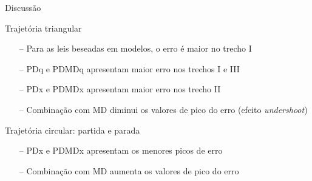 \documentclass[25pt,landscape]{beamer}
\begin{document}
\begin{frame}{Discussão}
        \begin{block}{Trajetória triangular}
        \begin{itemize}
            \item[--] Para as leis beseadas em modelos, o erro é maior no trecho I \\[5pt]
            \item[--] PDq e PDMDq apresentam maior erro nos trechos I e III \\[5pt]
            \item[--] PDx e PDMDx apresentam maior erro nos trecho II \\[5pt]
            \item[--] Combinação com MD diminui os valores de pico do erro (efeito \emph{undershoot}) \\[5pt]
        \end{itemize}
    \end{block}
    \begin{block}{Trajetória circular: partida e parada}
        \begin{itemize}
            \item[--] PDx e PDMDx apresentam os menores picos de erro \\[5pt]
            \item[--] Combinação com MD aumenta os valores de pico do erro \\[5pt]
        \end{itemize}
    \end{block}
\end{frame}
\end{document}
